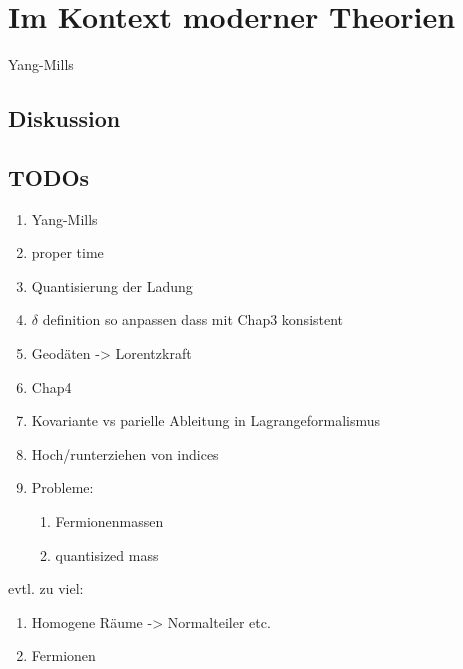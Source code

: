 \chapter{Im Kontext moderner Theorien}
Yang-Mills
\section{Diskussion}
\section{TODOs}
\begin{enumerate}

  \item Yang-Mills
  \item proper time
  \item Quantisierung der Ladung
  \item $\delta$ definition so anpassen dass mit Chap3 konsistent
  \item Geodäten -> Lorentzkraft
  \item Chap4
  \item Kovariante vs parielle Ableitung in Lagrangeformalismus
  \item Hoch/runterziehen von indices
  \item Probleme:
  \begin{enumerate}
   \item Fermionenmassen
   \item quantisized mass
   \end{enumerate}


    
\end{enumerate}
evtl. zu viel:
\begin{enumerate}
   \item Homogene Räume -> Normalteiler etc.
     \item Fermionen
\end{enumerate}